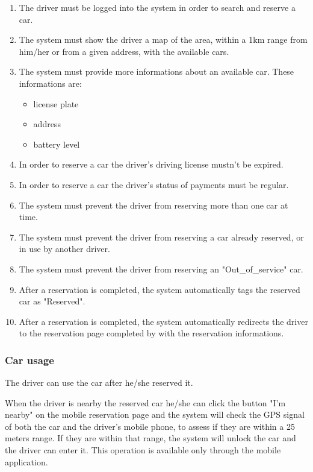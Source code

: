 \begin{enumerate}
	\item The driver must be logged into the system in order to search and reserve a car.
	\item The system must show the driver a map of the area, within a 1km range from him/her or from a given address, with the available cars.
	\item The system must provide more informations about an available car. These informations are:
		\begin{itemize}
			\item license plate
			\item address
			\item battery level
		\end{itemize}
	\item In order to reserve a car the driver's driving license mustn't be expired. \label{f-expired}
	\item In order to reserve a car the driver's status of payments must be regular. \label{f-regular}
	\item The system must prevent the driver from reserving more than one car at time.
	\item The system must prevent the driver from reserving a car already reserved, or in use by another driver.
	\item The system must prevent the driver from reserving an "Out\_of\_service" car.
	\item After a reservation is completed, the system automatically tags the reserved car as "Reserved".
	\item After a reservation is completed, the system automatically redirects the driver to the reservation page completed by with the reservation informations.
\end{enumerate}

\subsubsection{Car usage}

The driver can use the car after he/she reserved it.

When the driver is nearby the reserved car he/she can click the button "I'm nearby" on the mobile reservation page and the system will check the GPS signal of both the car and the driver's mobile phone, to assess if they are within a 25 meters range. If they are within that range, the system will unlock the car and the driver can enter it. This operation is available only through the mobile application.

